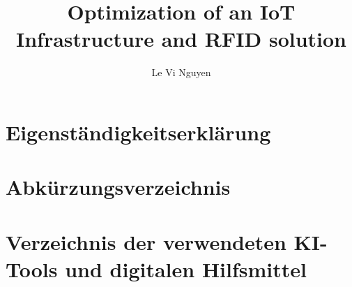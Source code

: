 \documentclass[watermark,twoside]{favf-thesis}
\author{Le Vi Nguyen}
\title{Optimization of an IoT Infrastructure and RFID solution}
\begin{document}



\chapter*{Eigenständigkeitserklärung}


\acresetall
\tableofcontents
\clearpage


\chapter*{Abkürzungsverzeichnis}


\clearpage

\listoffigures
\clearpage














\clearpage
\chapter*{Verzeichnis der verwendeten KI-Tools und digitalen Hilfsmittel}



\appendix 

\end{document}
